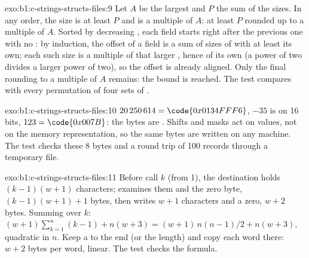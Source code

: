 \begin{solution}{exo:b1:c-strings-structs-files:9}
Let $A$ be the largest  and $P$ the sum of the sizes. In any order, the size is at least $P$ and is a multiple
of $A$: at least $P$ rounded up to a multiple of $A$. Sorted by decreasing , each field starts right after the
previous one with no : by induction, the offset of a field is a sum of sizes of  with  at least
its own; each such size is a multiple of that larger , hence of its own (a power of two divides a larger power
of two), so the offset is already aligned. Only the final rounding to a multiple of $A$ remains: the bound is reached.
The test  compares with every permutation of four sets of .
\end{solution}

\begin{solution}{exo:b1:c-strings-structs-files:10}
$20\,250\,614 = \code{0x0134FFF6}$, $-35$ is  on 16 bits, $123 = \code{0x007B}$: the bytes are
. Shifts and masks act on values, not on the memory representation, so the same bytes are
written on any machine. The test  checks these 8 bytes and a round trip of 100 records
through a temporary file.
\end{solution}

\begin{solution}{exo:b1:c-strings-structs-files:11}
Before call $k$ (from 1), the destination holds $(k-1)(w+1)$ characters;  examines them and the zero byte,
$(k-1)(w+1) + 1$ bytes, then writes $w + 1$ characters and a zero, $w + 2$ bytes. Summing over $k$:
$(w+1)\sum_{k=1}^{n}(k-1) + n(w+3) = (w+1)\,n(n-1)/2 + n(w+3)$, quadratic in $n$. Keep a  to the end (or the
length) and copy each word there: $w + 2$ bytes per word, linear. The test  checks
the formula.
\end{solution}


